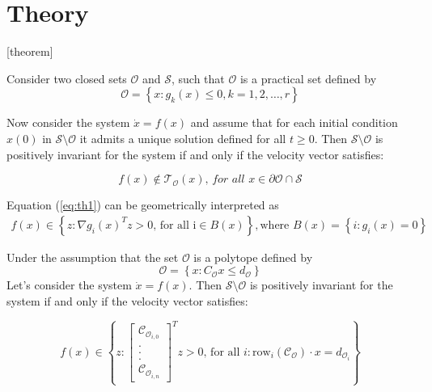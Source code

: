 % 

\section{Theory}
[theorem]
\begin{theorem}
Consider two closed sets $\mathcal{O}$ and $\mathcal{S}$, such that $\mathcal{O}$ is a practical set defined by
\begin{equation}
    \mathcal{O} = \left\{x : g_k(x) \leq 0, k = 1,2,\ldots,r \right\}
\end{equation}

Now consider the system $\dot{x} = f(x)$ and assume that for each initial
condition $x(0)$ in $\mathcal{S} \setminus \mathcal{O}$ it admits a unique solution defined for all $t \geq 0$. Then  
$\mathcal{S} \setminus \mathcal{O}$ is positively invariant for the system if and
only if the velocity vector satisfies:

\begin{equation}
    f(x) \notin \mathcal{T}_{\mathcal{O}}(x) \textit{, for all } x \in \partial\mathcal{O} \cap \mathcal{S}
    \label{eq:th1}
\end{equation}
\end{theorem}

Equation (\ref{eq:th1}) can be geometrically interpreted as
\begin{align*}
    f(x) \in \left\{z : \nabla g_{i}{(x)}^T z > 0 \text{, for all i} \in B(x)\right\} , \text{where } B(x) = \left\{i : g_i(x) = 0 \right\}
\end{align*}

\begin{corollary}
Under the assumption that the set $\mathcal{O}$ is a polytope defined by
\begin{equation}
    \mathcal{O} = \left\{x : C_{\mathcal{O}}x \leq d_{\mathcal{O}} \right\}
\end{equation}
Let's consider the system $\dot x = f(x)$. Then  
$\mathcal{S} \setminus \mathcal{O}$ is positively invariant for the 
system if and only if the velocity vector satisfies:

\begin{equation}
    f(x) \in \left\{z : \begin{bmatrix}
        \mathcal{C}_{\mathcal{O}_{i,0}}\\
        .\\
        .\\
        .\\
        \mathcal{C}_{\mathcal{O}_{i,n}}
    \end{bmatrix}^T z > 0 \text{, for all }i: \text{row}_i(\mathcal{C}_{\mathcal{O}}) \cdot x = d_{\mathcal{O}_i} \right\}
    \label{eq:col1}
\end{equation}
\end{corollary}